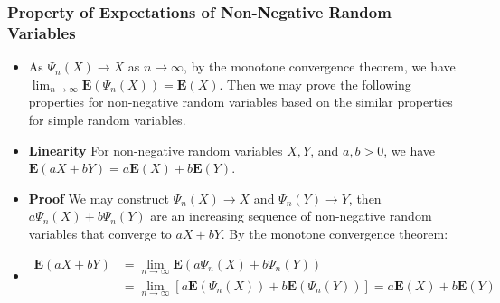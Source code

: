 \documentclass[handout]{beamer}
\newcommand{\BE}{\mathbf{E}}
\begin{document}
\frame
{
  \frametitle{Property of Expectations of Non-Negative Random Variables }

   \begin{itemize}


                         
                         \item<1-> As $\Psi_n(X)\rightarrow X$ as $n\rightarrow \infty$, by the monotone convergence theorem, we have $\lim_{n\rightarrow \infty} \BE(\Psi_n(X))=\BE(X)$. Then we may prove the following properties for non-negative random variables based on the similar properties for simple random variables.
                         
                         
                                                                                                                                                                                            
                         \item<2->  \textbf{Linearity} For non-negative random variables $X, Y$, and $a, b>0$, we have $\BE(aX+bY)=a\BE(X)+b\BE(Y)$.
                                        \item<3->[]\textbf{Proof} We may construct $\Psi_n(X)\rightarrow X$ and $\Psi_n(Y)\rightarrow Y$, then $a\Psi_n(X)+b\Psi_n(Y)$ are an increasing sequence of non-negative random variables that converge to $aX+bY$. By the monotone convergence theorem:
                              \item<4->[]                                \begin{align*}\BE(aX+bY)& =\lim_{n\rightarrow \infty} \BE (a\Psi_n(X)+b\Psi_n(Y)) \\ & =\lim_{n\rightarrow \infty}[ a\BE(\Psi_n(X))+b\BE(\Psi_n(Y)) ]=a\BE(X)+b\BE(Y)\end{align*}
                               
          
                               
                                                  
                                 \end{itemize}
}
\end{document}
